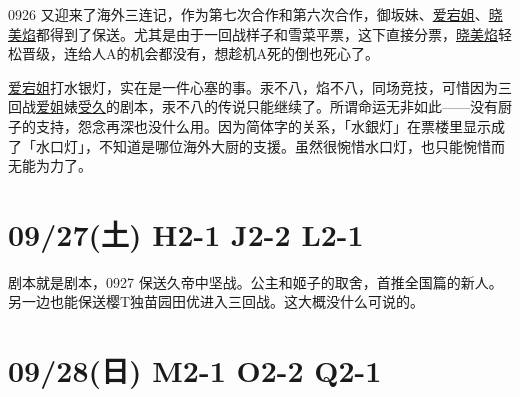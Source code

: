 0926 又迎来了海外三连记，作为第七次合作和第六次合作，御坂妹、\uline{爱宕姐}、\uline{晓美焰}都得到了保送。尤其是由于一回战样子和雪菜平票，这下直接分票，\uline{晓美焰}轻松晋级，连给人A的机会都没有，想趁机A死的倒也死心了。

\uline{爱宕姐}打水银灯，实在是一件心塞的事。汞不八，焰不八，同场竞技，可惜因为三回战\uline{爱姐}婊\uline{受久}的剧本，汞不八的传说只能继续了。所谓命运无非如此——没有厨子的支持，怨念再深也没什么用。因为简体字的关系，「水銀灯」在票楼里显示成了「水口灯」，不知道是哪位海外大厨的支援。虽然很惋惜水口灯，也只能惋惜而无能为力了。

\section{09/27(土) H2-1 J2-2 L2-1}


剧本就是剧本，0927 保送久帝中坚战。公主和姬子的取舍，首推全国篇的新人。另一边也能保送樱T独苗园田优进入三回战。这大概没什么可说的。

\section{09/28(日) M2-1 O2-2 Q2-1}


